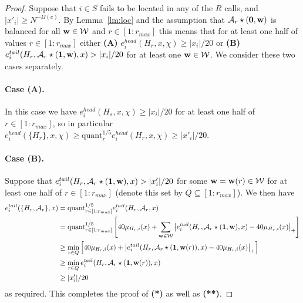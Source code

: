 \begin{proof}
Suppose that $i\in S$ fails to be located in any of the $R$ calls, and $|x'_i|\geq N^{-\Omega(c)}$. By Lemma~\ref{lm:loc} and the assumption that ${\mathcal{A}}_r\star(\mathbf{0}, \mathbf{w})$ is balanced for all $\mathbf{w}\in \mathcal{W}$ and $r\in [1:r_{max}]$ this means that for at least one half of values $r\in [1:r_{max}]$  either {\bf (A)} $e^{head}_{i}(H_r, x, \chi)\geq |x_i|/20$ or {\bf (B)} $e^{tail}_{i}(H_r, {\mathcal{A}}_r\star (\mathbf{1}, \mathbf{w}), x)> |x_i|/20$ for at least one $\mathbf{w}\in \mathcal{W}$. We consider these two cases separately.

\paragraph{Case (A).} In this case we have $e^{head}_{i}(H_s, x, \chi)\geq |x_i|/20$ for at least one half of $r\in [1:r_{max}]$, so 
in particular $e^{head}_i(\{H_r\}, x, \chi)\geq \text{quant}^{1/5}_r e^{head}_{i}(H_r, x, \chi)\geq |x'_i|/20$. 


\paragraph{Case (B).} Suppose that $e^{tail}_{i}(H_r, {\mathcal{A}}_r\star (\mathbf{1}, \mathbf{w}), x)> |x'_i|/20$ for some $\mathbf{w}=\mathbf{w}(r)\in \mathcal{W}$ for at least one half of $r\in [1:r_{max}]$ (denote this set by $Q\subseteq [1:r_{max}]$). We then have
\begin{equation*}
\begin{split}
e^{tail}_i(\{H_r, {\mathcal{A}}_r\}, x)&=\text{quant}^{1/5}_{r\in [1:r_{max}]} e^{tail}_i(H_r, {\mathcal{A}}_r, x)\\
&=\text{quant}^{1/5}_{r\in [1:r_{max}]} \left[40\mu_{H_r, i}(x)+\sum_{\mathbf{w}\in \mathcal{W}} \left|e^{tail}_i(H_r, {\mathcal{A}}_r\star (\mathbf{1}, \mathbf{w}), x)-40\mu_{H_r, i}(x)\right|_+\right]\\
&\geq \min_{r\in Q} \left[40\mu_{H_r, i}(x)+\left|e^{tail}_i(H_r, {\mathcal{A}}_r\star (\mathbf{1}, \mathbf{w}(r)), x)-40\mu_{H_r, i}(x)\right|_+\right]\\
&\geq \min_{r\in Q} e^{tail}_i(H_r, {\mathcal{A}}_r\star (\mathbf{1}, \mathbf{w}(r)), x)\\
&\geq |x'_i|/20
\end{split}
\end{equation*}
 as required. This completes the proof of {\bf (*)} as well as {\bf (**)}.
\end{proof}



